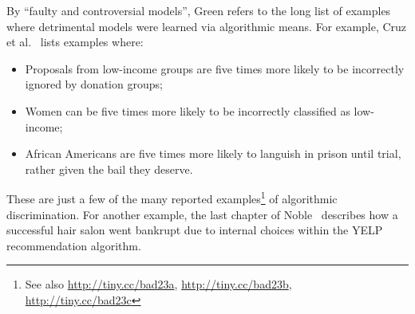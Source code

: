 By ``faulty and controversial models'', Green refers to
the  long list of examples where detrimental models  were learned via
algorithmic means.
For example,   Cruz et al.~\cite{cruz2021promoting}  lists examples where:
\begin{itemize}
\item Proposals from low-income groups are five times more  likely     to be incorrectly ignored by donation groups;
\item Women can be five times more likely to be incorrectly classified as low-income;
\item African Americans are five times more likely to  languish in prison until trial,
rather given the bail they deserve.  
\end{itemize}
These are just a few of the many reported examples\cite{rudin2019explaining}\footnote{See also 
\url{http://tiny.cc/bad23a}, \url{http://tiny.cc/bad23b}, \url{http://tiny.cc/bad23c}} of algorithmic discrimination.
For another example, the last chapter of Noble~\cite{noble2018algorithms} describes how a successful
hair salon went bankrupt due to internal
choices within the YELP recommendation algorithm.

